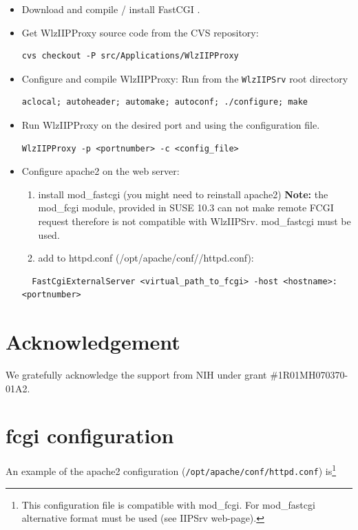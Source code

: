 \documentclass[11pt]{article}
\begin{document}
\begin{itemize}
\item Download and compile / install FastCGI \cite{LIBFCGI}.

\item Get WlzIIPProxy source code from the CVS repository:
\begin{verbatim}
cvs checkout -P src/Applications/WlzIIPProxy
\end{verbatim}

\item Configure and compile WlzIIPProxy:
Run from the \texttt{WlzIIPSrv} root directory
\begin{verbatim}
aclocal; autoheader; automake; autoconf; ./configure; make
\end{verbatim}


\item Run WlzIIPProxy on the desired port and using the configuration file.
\begin{verbatim}
WlzIIPProxy -p <portnumber> -c <config_file>
\end{verbatim}

\item Configure apache2 on the web server:
\begin{enumerate}
  \item install mod\_fastcgi (you might need to reinstall apache2)
  \textbf{Note:} the mod\_fcgi module, provided in SUSE 10.3 can not make
  remote FCGI request therefore is not compatible with WlzIIPSrv.
  mod\_fastcgi must be used.
  \item add to httpd.conf (/opt/apache/conf//httpd.conf):
\end{enumerate}
\begin{verbatim}
  FastCgiExternalServer <virtual_path_to_fcgi> -host <hostname>:<portnumber>
\end{verbatim}
\end{itemize}

\section{Acknowledgement}

We gratefully acknowledge the support from NIH under grant \#1R01MH070370-01A2.

\appendix

\section{fcgi configuration}
\label{sec:httpconf}
An example of the apache2 configuration
(\texttt{/opt/apache/conf/httpd.conf})
is\footnote{This configuration file is compatible with mod\_fcgi.
For mod\_fastcgi alternative format must be used (see IIPSrv web-page).}
\end{document}
